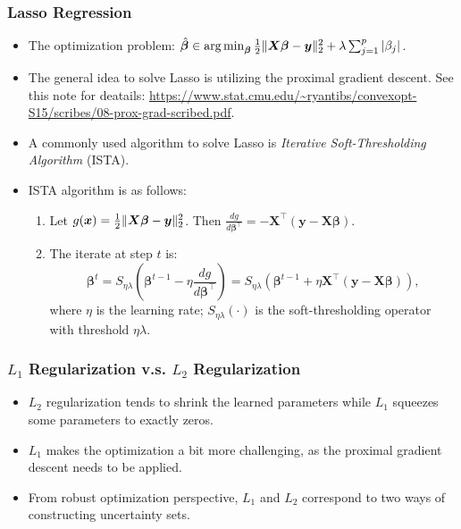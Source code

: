     \subsubsection{Lasso Regression}
        \begin{itemize}
            \item The optimization problem: $\hat{\bm{\beta}} \in \operatorname{arg\,min}_{\bm{\beta}} \frac{1}{2}\lVert\bm{X} \bm{\beta} - \bm{y}\rVert_2^2 + \lambda \sum_{j=1}^{p}{| \beta_j |}$.
            \item The general idea to solve Lasso is utilizing the proximal gradient descent.
            See this note for deatails: \url{https://www.stat.cmu.edu/~ryantibs/convexopt-S15/scribes/08-prox-grad-scribed.pdf}.
            \item A commonly used algorithm to solve Lasso is \emph{Iterative Soft-Thresholding Algorithm} (ISTA). 
            \item ISTA algorithm is as follows:
                \begin{enumerate}
                    \item Let $g(\bm{x}) = \frac{1}{2}\lVert\bm{X} \bm{\beta} - \bm{y}\rVert_2^2$. Then $\frac{d g}{d \bm{\beta}^\top} = -\bm{X}^\top(\bm{y} - \bm{X}\bm{\beta})$.
                    \item The iterate at step $t$ is:
                        \begin{equation}
                            \bm{\beta}^t = S_{\eta \lambda}\left( 
                                \bm{\beta}^{t-1} - \eta \frac{d g}{d \bm{\beta}^\top} 
                            \right) = S_{\eta \lambda}\left( 
                                \bm{\beta}^{t-1} + \eta \bm{X}^\top(\bm{y} - \bm{X}\bm{\beta}) 
                            \right),
                        \end{equation}
                    where $\eta$ is the learning rate; $S_{\eta \lambda}(\cdot)$ is the soft-thresholding operator with threshold $\eta \lambda$. 
                \end{enumerate}
        \end{itemize}
    
    \subsubsection{$L_1$ Regularization v.s. $L_2$ Regularization}
        \begin{itemize}
            \item $L_2$ regularization tends to shrink the learned parameters while $L_1$ squeezes some parameters to exactly zeros.
            \item $L_1$ makes the optimization a bit more challenging, as the proximal gradient descent needs to be applied.
            \item From robust optimization perspective, $L_1$ and $L_2$ correspond to two ways of constructing uncertainty sets. 
        \end{itemize}



